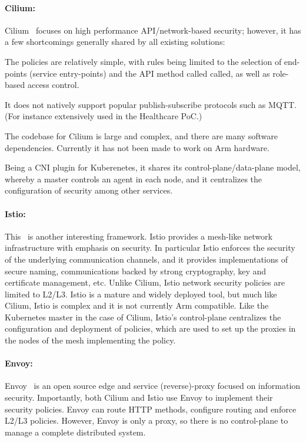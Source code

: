 \documentclass[a4paper]{article}
\begin{document}
\paragraph{\sc Cilium:} Cilium~\cite{cilium} focuses on high
performance API/network-based security; however, it has a few
shortcomings generally shared by all existing solutions:
\begin{inparaenum}
\item The policies are relatively simple, with rules being limited to
  the selection of end-points (service entry-points) and the API
  method called called, as well as role-based access control. 
\item It does not natively support popular publish-subscribe protocols
  such as MQTT.
  (For instance extensively used in the Healthcare PoC.)
\item The codebase for Cilium is large and complex, and there are many
  software dependencies.
  Currently it has not been made to work on Arm hardware.
\item Being a CNI plugin for Kuberenetes, it shares its
  control-plane/data-plane model, whereby a master controls an agent
  in each node, and it centralizes the configuration of security among
  other services.
\end{inparaenum}

\paragraph{\sc Istio:} This~\cite{istio} is another interesting
framework.
% 
Istio provides a mesh-like network infrastructure with emphasis on
security.
%
In particular Istio enforces the security of the underlying
communication channels, and it provides implementations of secure
naming, communications backed by strong cryptography, key and
certificate management, etc.
%
Unlike Cilium, Istio network security policies are limited to L2/L3. 
%
Istio is a mature and widely deployed tool, but much like Cilium,
Istio is complex and it is not currently Arm compatible.
%
Like the Kubernetes master in the case of Cilium, Istio's
control-plane centralizes the configuration and deployment of
policies, which are used to set up the proxies in the nodes of the
mesh implementing the policy.

\paragraph{\sc Envoy:} Envoy~\cite{envoy} is an open source edge and
service (reverse)-proxy focused on information security.
%
Importantly, both Cilium and Istio use Envoy to implement their
security policies.
%
Envoy can route HTTP methods, configure routing and enforce L2/L3
policies.
%
However, Envoy is only a proxy, so there is no control-plane to manage
a complete distributed system. 
\end{document}
